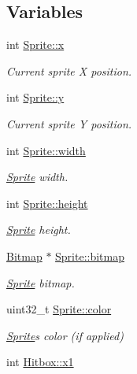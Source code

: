 \subsection*{Variables}
\begin{DoxyCompactItemize}
\item 
int \mbox{\hyperlink{group__sprite_gab36028dcefdd4bf024c52c8d9519a283}{Sprite\+::x}}
\begin{DoxyCompactList}\small\item\em Current sprite X position. \end{DoxyCompactList}\item 
int \mbox{\hyperlink{group__sprite_ga363e26017ee2aaed8636f7dab92af2cd}{Sprite\+::y}}
\begin{DoxyCompactList}\small\item\em Current sprite Y position. \end{DoxyCompactList}\item 
int \mbox{\hyperlink{group__sprite_ga0a3364944c5e361fc9e7ae406224d682}{Sprite\+::width}}
\begin{DoxyCompactList}\small\item\em \mbox{\hyperlink{struct_sprite}{Sprite}} width. \end{DoxyCompactList}\item 
int \mbox{\hyperlink{group__sprite_ga1f07c8f2080c193759aec0e13503d7ab}{Sprite\+::height}}
\begin{DoxyCompactList}\small\item\em \mbox{\hyperlink{struct_sprite}{Sprite}} height. \end{DoxyCompactList}\item 
\mbox{\hyperlink{struct_bitmap}{Bitmap}} $\ast$ \mbox{\hyperlink{group__sprite_ga626b702203ed42c3cd2af8f159eced42}{Sprite\+::bitmap}}
\begin{DoxyCompactList}\small\item\em \mbox{\hyperlink{struct_sprite}{Sprite}} bitmap. \end{DoxyCompactList}\item 
uint32\+\_\+t \mbox{\hyperlink{group__sprite_ga925050b598e308e3da33683aa2cb2aa7}{Sprite\+::color}}
\begin{DoxyCompactList}\small\item\em \mbox{\hyperlink{struct_sprite}{Sprite}}\textquotesingle{}s color (if applied) \end{DoxyCompactList}\item 
int \mbox{\hyperlink{group__sprite_gaac205203fe002b67015db70c9c19c6a2}{Hitbox\+::x1}}

\end{DoxyCompactItemize}
